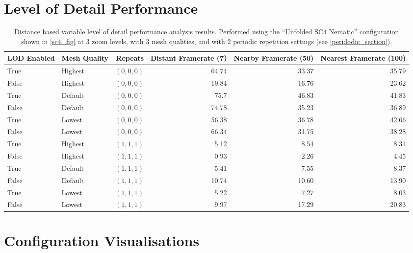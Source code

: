 \section{Level of Detail Performance}
\label{lod_analysis_section}
\begin{table}
  \begin{center}
  \begin{adjustbox}{width=\textwidth}
    \begin{tabular}{llrrrr}
    \hline
    \hline
    LOD Enabled & Mesh Quality & Repeats & Distant Framerate (7) & Nearby Framerate (50) & Nearest Framerate (100)\\
    \hline
    True & Highest & $(0,0,0)$ & 64.74 &  33.37 & 35.79 \\
    False & Highest & $(0,0,0)$ & 19.84 & 16.76 & 23.62 \\
    
    True & Default & $(0,0,0)$ & 75.7 & 46.83 & 41.83 \\
    False & Default & $(0,0,0)$ & 74.78 & 35.23 & 36.89 \\
    
    True & Lowest & $(0,0,0)$ & 56.38 & 36.78 & 42.66\\
    False & Lowest & $(0,0,0)$ & 66.34 & 31.75 & 38.28\\
    \hline
    True & Highest & $(1,1,1)$ & 5.12 & 8.54 & 8.31 \\
    False & Highest & $(1,1,1)$ & 0.93 & 2.26 & 4.45 \\
    
    True & Default & $(1,1,1)$ & 5.41 & 7.55 & 8.37 \\
    False & Default & $(1,1,1)$ & 10.74 & 10.60 & 13.90 \\
    
    True & Lowest & $(1,1,1)$ & 5.22 & 7.27 & 8.03\\
    False & Lowest & $(1,1,1)$ & 9.97 & 17.29 & 20.83\\
    \hline
    \hline
    \end{tabular}
  \end{adjustbox}
  \end{center}
  \caption{Distance based variable level of detail performance analysis results. Performed using the ``Unfolded SC4 Nematic'' configuration shown in \cref{sc4_fig} at 3 zoom levels, with 3 mesh qualities, and with 2 periodic repetition settings (see \cref{peridodic_section}).}
  \label{tab:lod_test}
\end{table}

\section{Configuration Visualisations}
